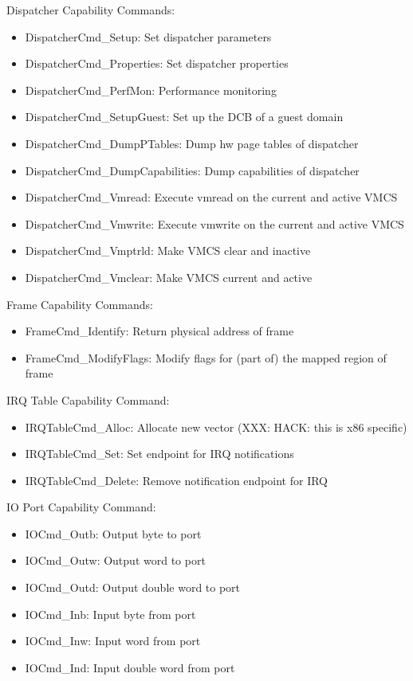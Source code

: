 \documentclass[a4paper,11pt,twoside]{report}
\begin{document}
{{Dispatcher Capability Commands:
\begin{itemize}
\item DispatcherCmd\_Setup: Set dispatcher parameters
\item DispatcherCmd\_Properties: Set dispatcher properties
\item DispatcherCmd\_PerfMon: Performance monitoring
\item DispatcherCmd\_SetupGuest: Set up the DCB of a guest domain
\item DispatcherCmd\_DumpPTables: Dump hw page tables of dispatcher
\item DispatcherCmd\_DumpCapabilities: Dump capabilities of dispatcher
\item DispatcherCmd\_Vmread: Execute vmread on the current and active VMCS
\item DispatcherCmd\_Vmwrite: Execute vmwrite on the current and active VMCS
\item DispatcherCmd\_Vmptrld: Make VMCS clear and inactive
\item DispatcherCmd\_Vmclear: Make VMCS current and active
\end{itemize}

Frame Capability Commands:
\begin{itemize}
\item FrameCmd\_Identify: Return physical address of frame
\item FrameCmd\_ModifyFlags: Modify flags for (part of) the mapped region of frame
\end{itemize}

IRQ Table Capability Command:
\begin{itemize}
\item IRQTableCmd\_Alloc: Allocate new vector (XXX: HACK: this is x86 specific)
\item IRQTableCmd\_Set: Set endpoint for IRQ notifications
\item IRQTableCmd\_Delete: Remove notification endpoint for IRQ
\end{itemize}

IO Port Capability Command:
\begin{itemize}
\item IOCmd\_Outb: Output byte to port
\item IOCmd\_Outw: Output word to port
\item IOCmd\_Outd: Output double word to port
\item IOCmd\_Inb: Input byte from port
\item IOCmd\_Inw: Input word from port
\item IOCmd\_Ind: Input double word from port
\end{itemize}

}}
\end{document}
